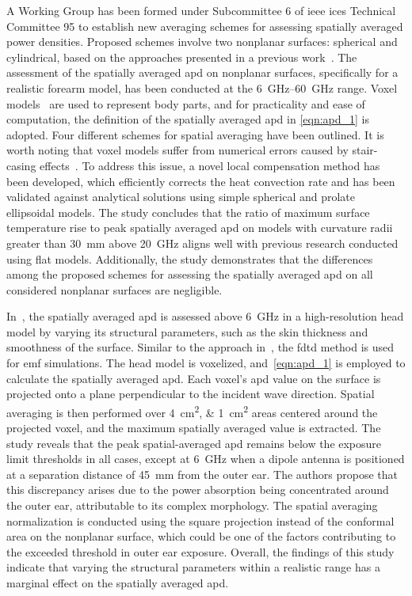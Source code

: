 A Working Group has been formed under Subcommittee \num{6} of \gls{ieee} \gls{ices} Technical Committee \num{95} to establish new averaging schemes for assessing spatially averaged power densities.
Proposed schemes involve two nonplanar surfaces: spherical and cylindrical, based on the approaches presented in a previous work~\cite{Diao2020Assessment}.
The assessment of the spatially averaged \gls{apd} on nonplanar surfaces, specifically for a realistic forearm model, has been conducted at the \SIrange{6}{60}{\GHz} range.
Voxel models~\cite{Baek2019FDTD} are used to represent body parts, and for practicality and ease of computation, the definition of the spatially averaged \gls{apd} in \cref{eqn:apd_1} is adopted.
Four different schemes for spatial averaging have been outlined.
It is worth noting that voxel models suffer from numerical errors caused by stair-casing effects~\cite{Baek2019FDTD,Poljak2018conformal}.
To address this issue, a novel local compensation method has been developed, which efficiently corrects the heat convection rate and has been validated against analytical solutions using simple spherical and prolate ellipsoidal models.
The study concludes that the ratio of maximum surface temperature rise to peak spatially averaged \gls{apd} on models with curvature radii greater than \SI{30}{\mm} above \SI{20}{\GHz} aligns well with previous research conducted using flat models.
Additionally, the study demonstrates that the differences among the proposed schemes for assessing the spatially averaged \gls{apd} on all considered nonplanar surfaces are negligible.

In~\cite{Taguchi2022Computation}, the spatially averaged \gls{apd} is assessed above \SI{6}{\GHz} in a high-resolution head model by varying its structural parameters, such as the skin thickness and smoothness of the surface.
Similar to the approach in~\cite{Diao2020Assessment}, the \gls{fdtd} method is used for \gls{emf} simulations.
The head model is voxelized, and~\cref{eqn:apd_1} is employed to calculate the spatially averaged \gls{apd}. 
Each voxel's \gls{apd} value on the surface is projected onto a plane perpendicular to the incident wave direction.
Spatial averaging is then performed over \SIlist{4;1}{\cm\squared} areas centered around the projected voxel, and the maximum spatially averaged value is extracted.
The study reveals that the peak spatial-averaged \gls{apd} remains below the exposure limit thresholds in all cases, except at \SI{6}{\GHz} when a dipole antenna is positioned at a separation distance of \SI{45}{\mm} from the outer ear.
The authors propose that this discrepancy arises due to the power absorption being concentrated around the outer ear, attributable to its complex morphology.
The spatial averaging normalization is conducted using the square projection instead of the conformal area on the nonplanar surface, which could be one of the factors contributing to the exceeded threshold in outer ear exposure.
Overall, the findings of this study indicate that varying the structural parameters within a realistic range has a marginal effect on the spatially averaged \gls{apd}.

